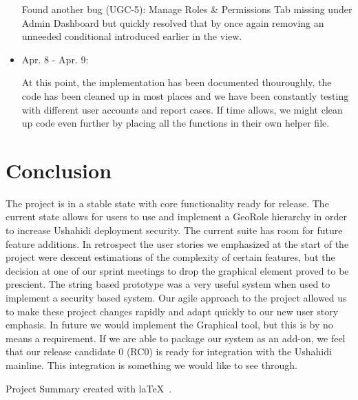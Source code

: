 \documentclass{article}
\begin{document}
\begin{itemize}
Found another bug (UGC-5): Manage Roles \& Permissions Tab missing under Admin Dashboard but quickly resolved that by once again removing an unneeded conditional introduced earlier in the view.
            
\item Apr. 8 - Apr. 9:

At this point, the implementation has been documented thouroughly, the code has been cleaned up in most places and we have been constantly testing with different user accounts and report cases.  If time allows, we might clean up code even further by placing all the functions in their own helper file. 
\end{itemize}

\section{Conclusion}
The project is in a stable state with core functionality ready for release. The current state allows for users to use and implement a GeoRole hierarchy in order to increase Ushahidi deployment security. The current suite has room for future feature additions. In retrospect the user stories we emphasized at the start of the project were descent estimations of the complexity of certain features, but the decision at one of our sprint meetings to drop the graphical element proved to be prescient. The string based prototype was a very useful system when used to implement a security based system. Our agile approach to the project allowed us to make these project changes rapidly and adapt quickly to our new user story emphasis. In future we would implement the Graphical tool, but this is by no means a requirement. If we are able to package our system as an add-on, we feel that our release candidate 0 (RC0) is ready for integration with the Ushahidi mainline. This integration is something we would like to see through.
\vfill
\begin{center}
Project Summary created with la\TeX~.
\end{center}
\end{document}
